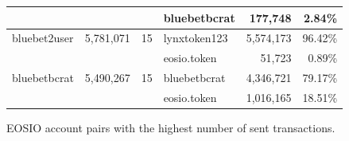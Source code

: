 \begin{figure*}
\begin{tabular}{l r r l r r}
		                              &                             &                     & bluebetbcrat   & 177,748                & 2.84\%                 \\
		\midrule
		\multirow{2}{*}{bluebet2user} & \multirow{2}{*}{5,781,071}  & \multirow{2}{*}{15} & lynxtoken123   & 5,574,173              & 96.42\%                \\
		                              &                             &                     & eosio.token    & 51,723                 & 0.89\%                 \\
		\midrule
		\multirow{2}{*}{bluebetbcrat} & \multirow{2}{*}{5,490,267}  & \multirow{2}{*}{15} & bluebetbcrat   & 4,346,721              & 79.17\%                \\
		                              &                             &                     & eosio.token    & 1,016,165              & 18.51\%                \\
		\bottomrule
	\end{tabular}
	\caption{EOSIO account pairs with the highest number of sent transactions.}
	\label{tab:eos-account-edges}
\end{figure*}